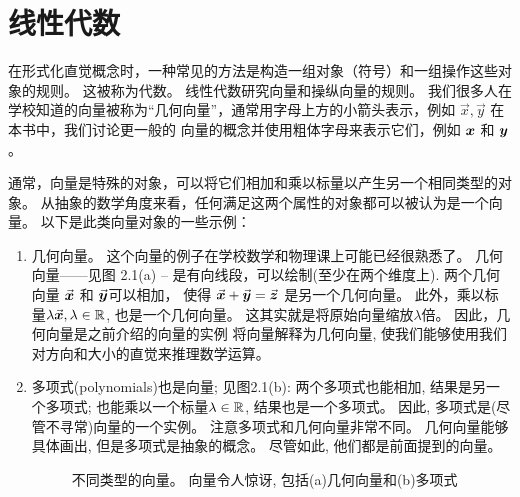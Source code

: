 \chapter{线性代数}
在形式化直觉概念时，一种常见的方法是构造一组对象（符号）和一组操作这些对象的规则。
这被称为代数。
线性代数研究向量和操纵向量的规则。
我们很多人在学校知道的向量被称为“几何向量”，通常用字母上方的小箭头表示，例如
$\vec{x} , \vec{y}$
在本书中，我们讨论更一般的
向量的概念并使用粗体字母来表示它们，例如 $\boldsymbol{x}$ 和 $\boldsymbol{y}$。

通常，向量是特殊的对象，可以将它们相加和乘以标量以产生另一个相同类型的对象。
从抽象的数学角度来看，任何满足这两个属性的对象都可以被认为是一个向量。
以下是此类向量对象的一些示例：

\begin{enumerate}
    \item 几何向量。
    这个向量的例子在学校数学和物理课上可能已经很熟悉了。
    几何向量——见图 2.1(a) – 是有向线段，可以绘制(至少在两个维度上).
    两个几何向量 $\vec{\boldsymbol{x}}$ 和 $\vec{\boldsymbol{y}}$可以相加，
    使得 $\vec{\boldsymbol{x}} + \vec{\boldsymbol{y}} = \vec{\boldsymbol{z}}$
    是另一个几何向量。
    此外，乘以标量$\lambda \vec{\boldsymbol{x}}, \lambda \in \mathbb{R}$, 也是一个几何向量。
    这其实就是将原始向量缩放$\lambda$倍。
    因此，几何向量是之前介绍的向量的实例
    将向量解释为几何向量, 使我们能够使用我们对方向和大小的直觉来推理数学运算。

    \item 多项式(polynomials)也是向量;
    见图2.1(b):
    两个多项式也能相加, 结果是另一个多项式;
    也能乘以一个标量$\lambda \in \mathbb{R}$, 结果也是一个多项式。
    因此, 多项式是(尽管不寻常)向量的一个实例。
    注意多项式和几何向量非常不同。
    几何向量能够具体画出, 但是多项式是抽象的概念。
    尽管如此, 他们都是前面提到的向量。

    \begin{figure}
    \caption{不同类型的向量。 向量令人惊讶, 包括(a)几何向量和(b)多项式}
    \end{figure}


\end{enumerate}
